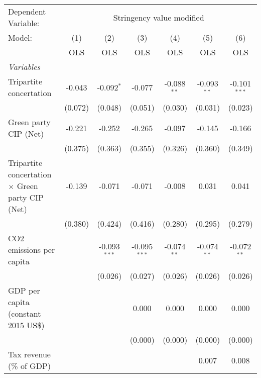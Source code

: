 
\begingroup
\centering
\begin{tabular}{lcccccc}
   \toprule
   Dependent Variable: & \multicolumn{6}{c}{Stringency value modified}\\
   Model:                                                  & (1)     & (2)            & (3)            & (4)           & (5)           & (6)\\  
                                                           &  OLS    & OLS            & OLS            & OLS           & OLS           & OLS\\  
   \midrule
   \emph{Variables}\\
   Tripartite concertation                                 & -0.043  & -0.092$^{*}$   & -0.077         & -0.088$^{**}$ & -0.093$^{**}$ & -0.101$^{***}$\\   
                                                           & (0.072) & (0.048)        & (0.051)        & (0.030)       & (0.031)       & (0.023)\\   
   Green party CIP (Net)                                   & -0.221  & -0.252         & -0.265         & -0.097        & -0.145        & -0.166\\   
                                                           & (0.375) & (0.363)        & (0.355)        & (0.326)       & (0.360)       & (0.349)\\   
   Tripartite concertation $\times$ Green party CIP (Net)  & -0.139  & -0.071         & -0.071         & -0.008        & 0.031         & 0.041\\   
                                                           & (0.380) & (0.424)        & (0.416)        & (0.280)       & (0.295)       & (0.279)\\   
   CO2 emissions per capita                                &         & -0.093$^{***}$ & -0.095$^{***}$ & -0.074$^{**}$ & -0.074$^{**}$ & -0.072$^{**}$\\   
                                                           &         & (0.026)        & (0.027)        & (0.026)       & (0.026)       & (0.026)\\   
   GDP per capita (constant 2015 US\$)                     &         &                & 0.000          & 0.000         & 0.000         & 0.000\\   
                                                           &         &                & (0.000)        & (0.000)       & (0.000)       & (0.000)\\   
   Tax revenue (\% of GDP)                                 &         &                &                &               & 0.007         & 0.008\\   

\end{tabular}
